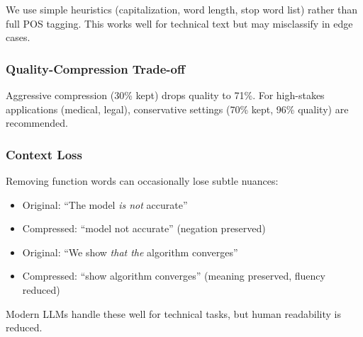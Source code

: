 We use simple heuristics (capitalization, word length, stop word list) rather than full POS tagging. This works well for technical text but may misclassify in edge cases.

\subsubsection{Quality-Compression Trade-off}

Aggressive compression (30\% kept) drops quality to 71\%. For high-stakes applications (medical, legal), conservative settings (70\% kept, 96\% quality) are recommended.

\subsubsection{Context Loss}

Removing function words can occasionally lose subtle nuances:
\begin{itemize}
    \item Original: ``The model \textit{is not} accurate''
    \item Compressed: ``model not accurate'' (negation preserved)
    \item Original: ``We show \textit{that the} algorithm converges''
    \item Compressed: ``show algorithm converges'' (meaning preserved, fluency reduced)
\end{itemize}

Modern LLMs handle these well for technical tasks, but human readability is reduced.
